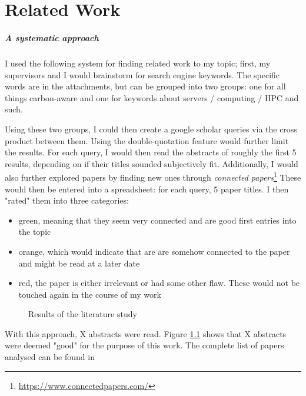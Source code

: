 \chapter{Related Work}

\paragraph{A systematic approach}

I used the following system for finding related work to my topic; 
first, my supervisors and I would brainstorm for search engine keywords. 
The specific words are in the attachments, but can be grouped into two groups: one for all things carbon-aware and one for keywords about servers / computing / HPC and such.

Using these two groups, I could then create a  google scholar queries via the cross product between them. Using the double-quotation feature would further limit the results.
For each query, I would then read the abstracts of roughly the first 5 results, depending on if their titles sounded subjectively fit. Additionally, I would also further explored papers by finding new ones through \emph{connected papers}\footnote{\url{https://www.connectedpapers.com/}}
These would then be entered into a spreadsheet: for each query, 5 paper titles. I then "rated" them into three categories:

\begin{itemize}
    \item green, meaning that they seem very connected and are good first entries into the topic
    \item orange, which would indicate that are are somehow connected to the paper and might be read at a later date
    \item red, the paper is either irrelevant or had some other flaw. These would not be touched again in the course of my work
\end{itemize}

\begin{figure}
    \caption[short]{Results of the literature study}
    \label{fig:literature_study}
\end{figure}

With this approach, X abstracts were read. Figure \ref{fig:literature_study} shows that X abstracts  were deemed "good" for the purpose of this work. The complete list of papers analysed can be found in 

